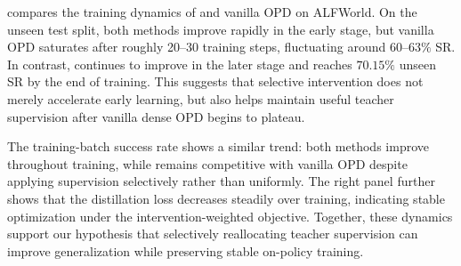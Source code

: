  compares the training dynamics of \ours{} and vanilla OPD on ALFWorld. 
%
On the unseen test split, both methods improve rapidly in the early stage, but vanilla OPD saturates after roughly 20--30 training steps, fluctuating around $60$--$63\%$ SR. 
%
In contrast, \ours{} continues to improve in the later stage and reaches $70.15\%$ unseen SR by the end of training. 
%
This suggests that selective intervention does not merely accelerate early learning, but also helps maintain useful teacher supervision after vanilla dense OPD begins to plateau.

The training-batch success rate shows a similar trend: both methods improve throughout training, while \ours{} remains competitive with vanilla OPD despite applying supervision selectively rather than uniformly. 
%
The right panel further shows that the \ours{} distillation loss decreases steadily over training, indicating stable optimization under the intervention-weighted objective. 
%
Together, these dynamics support our hypothesis that selectively reallocating teacher supervision can improve generalization while preserving stable on-policy training.